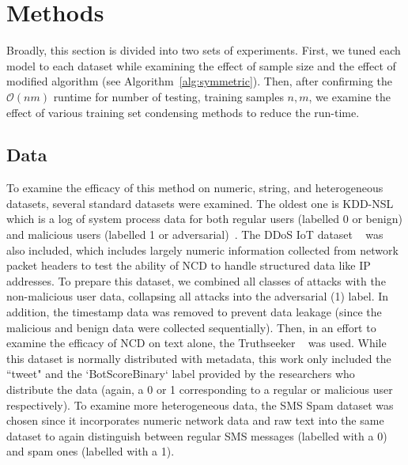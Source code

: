 \documentclass[conference]{IEEEtran}
\begin{document}
\section{Methods}
Broadly, this section is divided into two sets of experiments. First, we tuned each model to each dataset while examining the effect of sample size and the effect of modified algorithm (see Algorithm~\ref{alg:symmetric}). Then, after confirming the $\mathcal{O}(nm)$ runtime for number of testing, training samples $n,m$, we examine the effect of various training set condensing methods to reduce the run-time. 


\label{methods}
\subsection{Data}
\label{datasets}
To examine the efficacy of this method on numeric, string, and heterogeneous datasets, several standard datasets were examined. 
The oldest one is KDD-NSL which is a log of system process data for both regular users (labelled 0 or benign) and malicious users (labelled 1 or adversarial)~\cite{kddnsl}. 
The DDoS IoT dataset ~\cite{ddos} was also included, which includes largely numeric information collected from network packet headers to test the ability of NCD to handle structured data like IP addresses. 
To prepare this dataset, we combined all classes of attacks with the non-malicious user data, collapsing all attacks into the adversarial (1) label. 
In addition, the timestamp data was removed to prevent data leakage  (since the malicious and benign data were collected sequentially). 
Then, in an effort to examine the efficacy of NCD on text alone, the Truthseeker ~\cite{truthseeker} was used. 
While this dataset is normally distributed with metadata, this work only included the ``tweet" and the `BotScoreBinary` label provided by the researchers who distribute the data (again, a 0 or 1 corresponding to a regular or malicious user respectively). 
To examine more heterogeneous data, the SMS Spam dataset was chosen since it incorporates numeric network data and raw text into the same dataset to again distinguish between regular SMS messages (labelled with a 0) and spam ones (labelled with a 1). 
\end{document}
